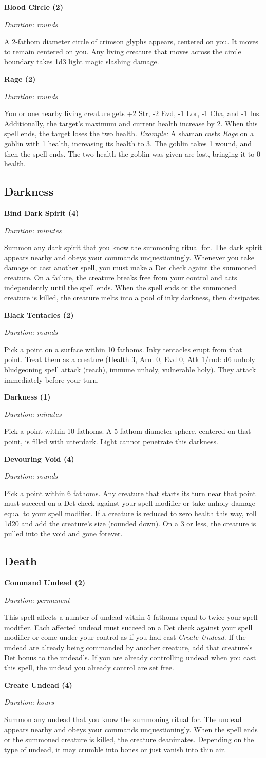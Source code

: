 \documentclass[letterpaper, 12pt, twocolumn]{book}
\def\unnumberedsubsection#1{\subsection*{#1}\addcontentsline{toc}{subsection}{#1}}
\def\example#1{\textit{Example:} #1}
\def\spell#1#2#3#4{\textbf{#1 (#2)}

\textit{Duration: #3}

#4\bigskip}
\def\bind#1#2{Summon any #1 that you know the summoning ritual for. The #1 appears nearby and obeys your commands unquestioningly.
Whenever you take damage or cast another spell, you must make a Det check againt the summoned creature. On a failure, the creature
breaks free from your control and acts independently until the spell ends. When the spell ends or the summoned creature is killed, the
creature #2.}
\def\create#1#2{Summon any #1 that you know the summoning ritual for. The #1 appears nearby and obeys your commands unquestioningly.
When the spell ends or the summoned creature is killed, the creature #2.}
\begin{document}
\spell{Blood Circle}{2}{rounds}{A 2-fathom diameter circle of crimson glyphs appears, centered on you. It moves to remain centered on you.
Any living creature that moves across the circle boundary takes 1d3 light magic slashing damage.}

\spell{Rage}{2}{rounds}{You or one nearby living creature gets +2 Str, -2 Evd, -1 Lor, -1 Cha, and -1 Ins. Additionally, the target's maximum and current health increase by 2. When this spell ends, the target loses the two health.
\newline
\example{A shaman casts \textit{Rage} on a goblin with 1 health, increasing its health to 3. The goblin takes 1 wound, and then the spell
ends. The two health the goblin was given are lost, bringing it to 0 health.}}


\unnumberedsubsection{Darkness}
\spell{Bind Dark Spirit}{4}{minutes}{\bind{dark spirit}{melts into a pool of inky darkness, then dissipates}}

\spell{Black Tentacles}{2}{rounds}{Pick a point on a surface within 10 fathoms. Inky tentacles erupt from that point. Treat them as a creature
(Health 3, Arm 0, Evd 0, Atk 1/rnd: d6 unholy bludgeoning spell attack (reach), immune unholy, vulnerable holy). They attack immediately
before your turn.}

\spell{Darkness}{1}{minutes}{Pick a point within 10 fathoms. A 5-fathom-diameter sphere, centered on that point, is filled with utterdark.
Light cannot penetrate this darkness.}

\spell{Devouring Void}{4}{rounds}{Pick a point within 6 fathoms. Any creature that starts its turn near that point must succeed on a Det
check against your spell modifier or take unholy damage equal to your spell modifier. If a creature is reduced to zero health this way,
roll 1d20 and add the creature's size (rounded down). On a 3 or less, the creature is pulled into the void and gone forever.}


\unnumberedsubsection{Death}
\spell{Command Undead}{2}{permanent}{This spell affects a number of undead within 5 fathoms equal to twice your spell modifier. Each affected
undead must succeed on a Det check against your spell modifier or come under your control as if you had cast \textit{Create Undead}. If
the undead are already being commanded by another creature, add that creature's Det bonus to the undead's. If you are already controlling
undead when you cast this spell, the undead you already control are set free.}

\spell{Create Undead}{4}{hours}{\create{undead}{deanimates. Depending on the type of undead, it may crumble into bones or just vanish into thin air}}
\end{document}
